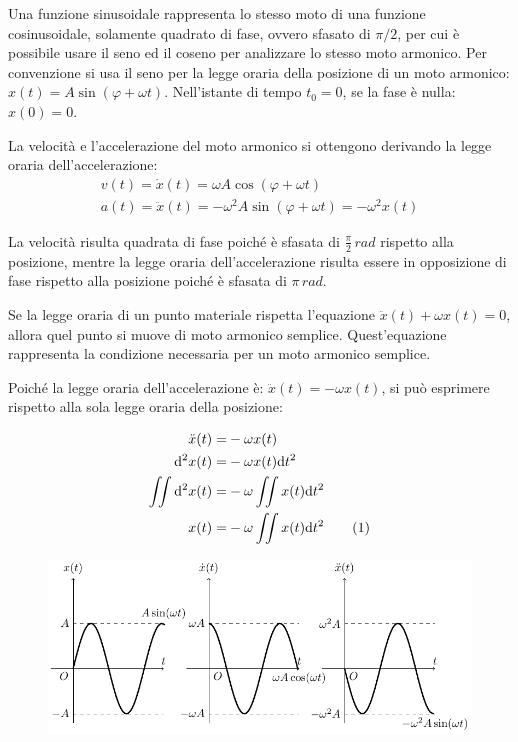 \documentclass{article}
\newcommand{\df}{\mathrm{d}}
\numberwithin{equation}{subsection}
\begin{document}
Una funzione sinusoidale rappresenta lo stesso moto di una funzione cosinusoidale, solamente quadrato di fase, ovvero sfasato di $\pi/2$, 
per cui è possibile usare il seno ed il coseno per analizzare lo stesso moto armonico. 
Per convenzione si usa il seno per la legge oraria della posizione 
di un moto armonico: $x(t) = A\sin(\varphi + \omega t)$. Nell'istante di tempo $t_0 = 0$, se la fase è nulla: $x(0) = 0$. 

La velocità e l'accelerazione del moto armonico si ottengono 
derivando la legge oraria dell'accelerazione:
\begin{gather}
    v(t) = \dot x(t) = \omega A\cos(\varphi+\omega t)\\
    a(t)= \ddot x(t) = -\omega^{2}A\sin(\varphi+\omega t) = -\omega^{2}x(t)
\end{gather}

La velocità risulta quadrata di fase poiché è sfasata di $\displaystyle\frac{\pi}{2}\,rad$  rispetto alla posizione, mentre la legge oraria dell'accelerazione 
risulta essere in opposizione di fase rispetto alla posizione poiché è sfasata di $\pi\,rad$. 

Se la legge oraria di un punto materiale rispetta l'equazione $\ddot x(t)+\omega x(t)=0$, allora quel punto si muove di moto armonico semplice. Quest'equazione 
rappresenta la condizione necessaria per un moto armonico semplice. 

Poiché la legge oraria dell'accelerazione è: $\ddot x(t) = -\omega x(t)$, 
si può esprimere rispetto alla sola legge oraria della posizione:

\begin{align*}
    \ddot x(t) =& -\omega x(t) \\
    \df^{2}x(t) =& -\omega x(t)\df t^{2} \\
    \displaystyle\iint \df^{2}x(t)=& -\omega\iint x(t)\df t^{2}\\
    \displaystyle x(t) =& -\omega\iint x(t)\df t^{2}\tag{\stepcounter{equation}\theequation}
\end{align*}
\begin{figure}[H]%
    \centering
    \includegraphics{moto-armonico.pdf}%
\end{figure}
\end{document}
